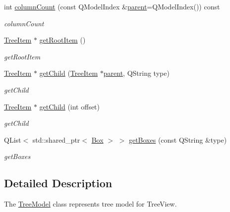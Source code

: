 \begin{DoxyCompactItemize}
int \hyperlink{class_tree_model_a53225feea015d80b2e025d401ae163b4}{column\-Count} (const Q\-Model\-Index \&\hyperlink{class_tree_model_a210d05503fb8758b7bad1c4fd4c5ae6b}{parent}=Q\-Model\-Index()) const 
\begin{DoxyCompactList}\small\item\em column\-Count \end{DoxyCompactList}\item 
\hyperlink{class_tree_item}{Tree\-Item} $\ast$ \hyperlink{class_tree_model_a26584490cc0415ea11e278c19537dae2}{get\-Root\-Item} ()
\begin{DoxyCompactList}\small\item\em get\-Root\-Item \end{DoxyCompactList}\item 
\hyperlink{class_tree_item}{Tree\-Item} $\ast$ \hyperlink{class_tree_model_a0ae0a419cd7a33184256eb63bada069d}{get\-Child} (\hyperlink{class_tree_item}{Tree\-Item} $\ast$\hyperlink{class_tree_model_a210d05503fb8758b7bad1c4fd4c5ae6b}{parent}, Q\-String type)
\begin{DoxyCompactList}\small\item\em get\-Child \end{DoxyCompactList}\item 
\hyperlink{class_tree_item}{Tree\-Item} $\ast$ \hyperlink{class_tree_model_a2ccfd086c70bb687f32f89543d14aca4}{get\-Child} (int offset)
\begin{DoxyCompactList}\small\item\em get\-Child \end{DoxyCompactList}\item 
Q\-List$<$ std\-::shared\-\_\-ptr$<$ \hyperlink{class_box}{Box} $>$ $>$ \hyperlink{class_tree_model_a236dc60edabafa2d83b08b4a8b65e0f5}{get\-Boxes} (const Q\-String \&type)
\begin{DoxyCompactList}\small\item\em get\-Boxes \end{DoxyCompactList}\end{DoxyCompactItemize}


\subsection{Detailed Description}
The \hyperlink{class_tree_model}{Tree\-Model} class represents tree model for Tree\-View. 

